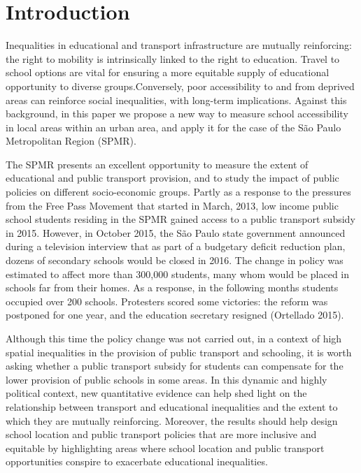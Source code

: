 \documentclass[3p,authoryear,preprint,review,12pt]{elsarticle}
\begin{document}
\newpage
\section{Introduction}\label{introduction}

Inequalities in educational and transport infrastructure are mutually reinforcing: the right to mobility is intrinsically linked to the right to education. Travel to school options are vital for ensuring a more equitable supply of educational opportunity to diverse groups.Conversely, poor accessibility to and from deprived areas can reinforce social inequalities, with long-term implications. Against this background, in this paper we propose a new way to measure school accessibility in local areas within an urban area, and apply it for the case of the São Paulo Metropolitan Region (SPMR).

The SPMR presents an excellent opportunity to measure the extent of
educational and public transport provision, and to study the impact of
public policies on different socio-economic groups. Partly as a response to the pressures from the Free Pass Movement that started in March, 2013, low income public school students residing in the SPMR gained access to a public transport subsidy in 2015. However, in October 2015, the São Paulo state government announced during a television interview that as part of a budgetary deficit reduction plan, dozens of secondary schools would be closed in 2016. The change in policy was estimated to affect more than 300,000 students, many whom would be placed in schools far from their homes. As a response, in the following months students occupied over 200 schools. Protesters scored some victories: the reform was postponed for one year, and the education secretary resigned (Ortellado 2015).

Although this time the policy change was not carried out, in a context of high spatial inequalities in the provision of public transport and schooling, it is worth asking whether a public transport subsidy for students can compensate for the lower provision of public schools in some areas. In this dynamic and highly political context, new quantitative evidence can help shed light on the relationship between transport and educational inequalities and the extent to which they are mutually reinforcing. Moreover, the results should help design school location and public transport policies that are more inclusive and equitable by highlighting areas where
school location and public transport opportunities conspire to exacerbate educational inequalities.
\end{document}
